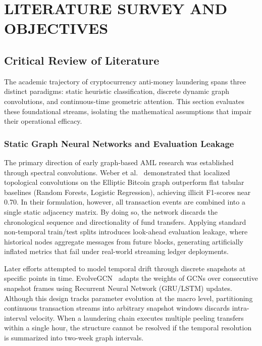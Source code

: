 \chapter{LITERATURE SURVEY AND OBJECTIVES}
\label{ChapterLiteratureSurvey}

\section{Critical Review of Literature}
\label{sec:critical_review}

The academic trajectory of cryptocurrency anti-money laundering spans three distinct paradigms: static heuristic classification, discrete dynamic graph convolutions, and continuous-time geometric attention. This section evaluates these foundational streams, isolating the mathematical assumptions that impair their operational efficacy.

\subsection{Static Graph Neural Networks and Evaluation Leakage}

The primary direction of early graph-based AML research was established through spectral convolutions. Weber et al.~\cite{weber2019anti} demonstrated that localized topological convolutions on the Elliptic Bitcoin graph outperform flat tabular baselines (Random Forests, Logistic Regression), achieving illicit F1-scores near 0.70. In their formulation, however, all transaction events are combined into a single static adjacency matrix. By doing so, the network discards the chronological sequence and directionality of fund transfers. Applying standard non-temporal train/test splits introduces look-ahead evaluation leakage, where historical nodes aggregate messages from future blocks, generating artificially inflated metrics that fail under real-world streaming ledger deployments.

Later efforts attempted to model temporal drift through discrete snapshots at specific points in time. EvolveGCN~\cite{pareja2020evolvegcn} adapts the weights of GCNs over consecutive snapshot frames using Recurrent Neural Network (GRU/LSTM) updates. Although this design tracks parameter evolution at the macro level, partitioning continuous transaction streams into arbitrary snapshot windows discards intra-interval velocity. When a laundering chain executes multiple peeling transfers within a single hour, the structure cannot be resolved if the temporal resolution is summarized into two-week graph intervals.

